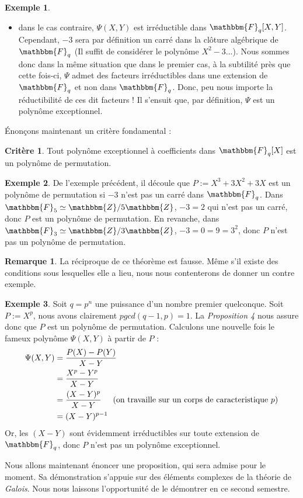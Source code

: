 \documentclass[12pt]{article}
\newcommand{\Fq}{\mathbbm{F}_q}
\theoremstyle{definition}
\newtheorem{example}{Exemple}
\newtheorem{rem}{Remarque}
\newtheorem{crit}{Critère}
\begin{document}
\begin{example}
\begin{itemize}
		\item dans le cas contraire, $\Psi(X,Y)$ est irréductible dans $\Fq[X,Y]$. Cependant, $-3$ sera par définition un carré dans la clôture algébrique de $\Fq$ (Il suffit de considérer le polynôme $X^2 - 3$...). Nous sommes donc dans la même situation que dans le premier cas, à la subtilité près que cette fois-ci, $\Psi$ admet des facteurs irréductibles dans une extension de $\Fq$ et non dans $\Fq$. Donc, peu nous importe la réductibilité de ces dit facteurs ! Il s'ensuit que, par définition, $\Psi$ est un polynôme exceptionnel.
		\end{itemize}
\end{example}

Énonçons maintenant un critère fondamental :

\begin{crit}
Tout polynôme exceptionnel à coefficients dans $\Fq[X]$ est un polynôme de permutation.
\end{crit}

\begin{example}
De l'exemple précédent, il découle que $P := X^3 +3X^2 + 3X$ est un polynôme de permutation si $-3$ n'est pas un carré dans $\Fq$. \newline
Dans $\mathbbm{F}_5 \simeq \mathbbm{Z}/5\mathbbm{Z}$, $-3 = 2$ qui n'est pas un carré, donc $P$ est un polynôme de permutation. En revanche, dans $\mathbbm{F}_3 \simeq \mathbbm{Z}/ 3\mathbbm{Z}$, $-3 = 0 = 9 = 3^2$, donc $P$ n'est pas un polynôme de permutation.
\end{example}

\begin{rem}
La réciproque de ce théorème est fausse. Même s'il existe des conditions sous lesquelles elle a lieu, nous nous contenterons de donner un contre exemple.
\end{rem}

\begin{example}
Soit $q = p^n$ une puissance d'un nombre premier quelconque. Soit $P := X^p$, nous avons clairement $pgcd(q-1, p) = 1$. La \textit{Proposition 4} nous assure donc que $P$ est un polynôme de permutation. Calculons une nouvelle fois le fameux polynôme $\Psi(X,Y)$ à partir de $P$ :
	\begin{align*}
\Psi(X,Y) &= \displaystyle\frac{P(X) - P(Y)}{X-Y} \\
&= \displaystyle\frac{X^p - Y^p}{X-Y} \\
&= \displaystyle\frac{(X-Y)^p}{X-Y} \hspace{0,5cm} \text{(on travaille sur un corps de caracteristique $p$)} \\
&= (X-Y)^{p-1}
	\end{align*}
Or, les $(X-Y)$ sont évidemment irréductibles sur toute extension de $\Fq$, donc $P$ n'est pas un polynôme exceptionnel.
\end{example}
Nous allons maintenant énoncer une proposition, qui sera admise pour le moment. Sa démonstration s'appuie sur des éléments complexes de la théorie de \textit{Galois}. Nous nous laissons l'opportunité de le démontrer en ce second semestre.
\end{document}
